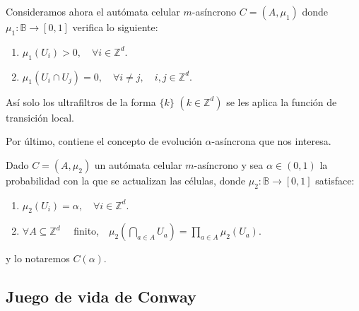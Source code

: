 \documentclass[../proyecto.tex]{memoir}
\begin{document}
\begin{defi}
Consideramos ahora el autómata celular $m$-asíncrono $C=(A, \mu_{1})$ donde $\mu_{1}: \mathds{B} \rightarrow [0,1]$ verifica lo siguiente:

\begin{enumerate}
\item $\mu_{1}(U_{i}) > 0, \quad \forall i \in \mathds{Z}^{d}$.
\item $\mu_{1}(U_{i} \cap U_{j}) = 0, \quad \forall i \neq j, \quad i,j \in \mathds{Z}^{d}$.
\end{enumerate}
\end{defi}

Así solo los ultrafiltros de la forma $\{k\}$ $(k \in \mathds{Z}^{d})$ se les aplica la función de transición local.

Por último, contiene el concepto de evolución $\alpha$-asíncrona que nos interesa. 
\begin{defi} \label{alhpaasin}
Dado $C=(A, \mu_{2})$ un autómata celular $m$-asíncrono y sea $\alpha \in (0,1)$ la probabilidad con la que se actualizan las células, donde $\mu_{2}: \mathds{B} \to [0,1]$ satisface:

\begin{enumerate}
\item $\mu_{2}(U_{i}) = \alpha, \quad \forall i \in \mathds{Z}^{d}$.
\item $ \forall A \subseteq \mathds{Z}^{d} \quad$ finito,$\quad  \mu_{2} ( \bigcap_{a \in A} U_{a} ) = \prod_{a \in A} \mu_{2} ( U_{a} )$.
\end{enumerate}
\end{defi}

y lo notaremos $C(\alpha)$.
\subsection{Juego de vida de Conway}
\end{document}
